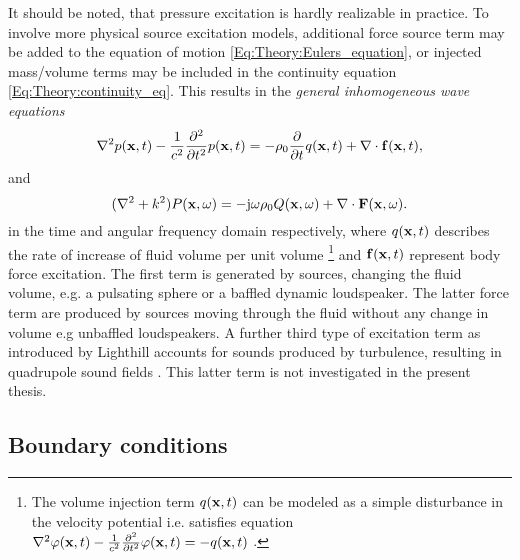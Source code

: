 It should be noted, that pressure excitation is hardly realizable in practice.
To involve more physical source excitation models, additional force source term may be added to the equation of motion \eqref{Eq:Theory:Eulers_equation}, or injected mass/volume terms may be included in the continuity equation \eqref{Eq:Theory:continuity_eq}.
This results in the \emph{general inhomogeneous wave equations} \cite{Howe2007, Kinsler2000, Pierce1991}
\begin{equation}
\nabla^2 p(\mathbf{x},t) -\frac{1}{c^2}\frac{\partial^2}{\partial t^2}p(\mathbf{x},t) = - \rho_0 \frac{\partial}{\partial t} q(\mathbf{x},t) + \nabla \cdot \mathbf{f}(\mathbf{x},t),
\label{Eq:Theory:Inhomogene_wave_eq_time_domain}
\end{equation}
and
\begin{equation}
(\nabla^2 + k^2 ) P(\mathbf{x},\omega ) = - \mathrm{j} \omega \rho_0 Q(\mathbf{x},\omega) + \nabla \cdot \mathbf{F}(\mathbf{x},\omega).
\label{Eq:Theory:Inhomogene_wave_eq_freq_domain}
\end{equation}
in the time and angular frequency domain respectively, where $q(\mathbf{x},t)$ describes the rate of increase of fluid volume per unit volume 
\footnote{The volume injection term $q(\mathbf{x},t)$ can be modeled as a simple disturbance in the velocity potential i.e. satisfies equation $\nabla^2 \varphi(\mathbf{x},t) -\frac{1}{c^2}\frac{\partial^2}{\partial t^2}\varphi(\mathbf{x},t) = -q(\mathbf{x},t)$ \cite{Jensen2007}.}
and $\mathbf{f}(\mathbf{x},t)$ represent body force excitation.
The first term is generated by sources, changing the fluid volume, e.g. a pulsating sphere or a baffled dynamic loudspeaker.
The latter force term are produced by sources moving through the fluid without any change in volume e.g unbaffled loudspeakers.
A further third type of excitation term as introduced by Lighthill accounts for sounds produced by turbulence, resulting in quadrupole sound fields \cite[p. 141]{Kinsler2000}. 
This latter term is not investigated in the present thesis.

\subsection{Boundary conditions}
\label{Section:Theory:Boundary_conditions}

